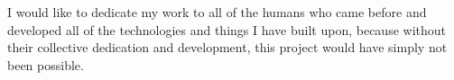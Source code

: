 I would like to dedicate my work to all of the humans who came before and developed all of the technologies and things I have built upon, because without their collective dedication and development, this project would have simply not been possible.

